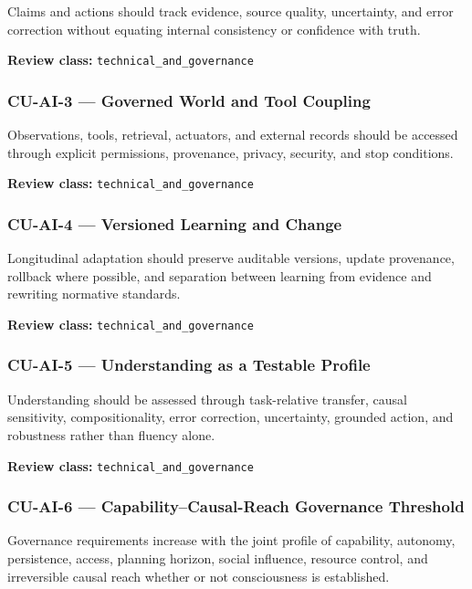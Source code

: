 \documentclass[
  11pt,
]{article}
\begin{document}
Claims and actions should track evidence, source quality, uncertainty,
and error correction without equating internal consistency or confidence
with truth.

\textbf{Review class:} \texttt{technical\_and\_governance}

\subsubsection{CU-AI-3 --- Governed World and Tool
Coupling}\label{cu-ai-3-governed-world-and-tool-coupling}

Observations, tools, retrieval, actuators, and external records should
be accessed through explicit permissions, provenance, privacy, security,
and stop conditions.

\textbf{Review class:} \texttt{technical\_and\_governance}

\subsubsection{CU-AI-4 --- Versioned Learning and
Change}\label{cu-ai-4-versioned-learning-and-change}

Longitudinal adaptation should preserve auditable versions, update
provenance, rollback where possible, and separation between learning
from evidence and rewriting normative standards.

\textbf{Review class:} \texttt{technical\_and\_governance}

\subsubsection{CU-AI-5 --- Understanding as a Testable
Profile}\label{cu-ai-5-understanding-as-a-testable-profile}

Understanding should be assessed through task-relative transfer, causal
sensitivity, compositionality, error correction, uncertainty, grounded
action, and robustness rather than fluency alone.

\textbf{Review class:} \texttt{technical\_and\_governance}

\subsubsection{CU-AI-6 --- Capability--Causal-Reach Governance
Threshold}\label{cu-ai-6-capabilitycausal-reach-governance-threshold}

Governance requirements increase with the joint profile of capability,
autonomy, persistence, access, planning horizon, social influence,
resource control, and irreversible causal reach whether or not
consciousness is established.
\end{document}

